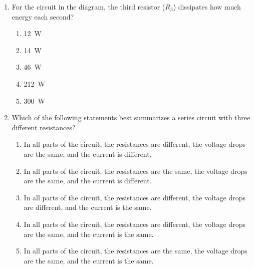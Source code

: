 \documentclass{../../../oss-apphys}
\begin{document}
\begin{multicols*}{2}
\begin{enumerate}[leftmargin=18pt,resume]
  \item For the circuit in the diagram, the third resistor ($R_3$) dissipates
    how much energy each second?
    \begin{enumerate}[noitemsep,topsep=0pt,leftmargin=18pt,label=(\Alph*)]
    \item\SI{12}{W}
    \item\SI{14}{W}
    \item\SI{46}{W}
    \item\SI{212}{W}
    \item\SI{300}{W}
    \end{enumerate}
    \label{parallel4}
    \columnbreak

  \item Which of the following statements best summarizes a series circuit
    with three different resistances?
    \begin{enumerate}[noitemsep,topsep=0pt,leftmargin=18pt,label=(\Alph*)]
    \item In all parts of the circuit, the resistances are different, the
      voltage drops are the same, and the current is different.
    \item In all parts of the circuit, the resistances are the same, the voltage
      drops are the same, and the current is different.
    \item In all parts of the circuit, the resistances are different, the
      voltage drops are different, and the current is the same.
    \item In all parts of the circuit, the resistances are different, the
      voltage drops are the same, and the current is the same.
    \item In all parts of the circuit, the resistances are the same, the
      voltage drops are the same, and the current is the same.
    \end{enumerate}
       
%


\end{enumerate}
\end{multicols*}
\end{document}
